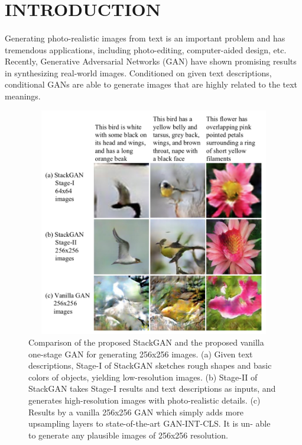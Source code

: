 \documentclass[a4paper,12pt,oneside]{article}
\begin{document}
\setlength{\baselineskip}{1.0\baselineskip}
\newpage
\begin{center}
\tableofcontents
\end{center}
\newpage
\thispagestyle{plain}
\begin{center}
\vspace{5mm}
\listoffigures
\end{center}

\newpage
\rfoot{\thepage}



\rfoot{\thepage}
\section{INTRODUCTION}
\paragraph{}
Generating photo-realistic images from text is an important problem and has tremendous applications, including photo-editing, computer-aided design, etc. Recently, Generative Adversarial Networks (GAN) have shown promising results in synthesizing real-world images. Conditioned on given text descriptions, conditional GANs are able to generate images that are highly related to the text meanings. 

\begin{figure}[H]
\centering
\includegraphics[height=10cm,width=15cm]{Figure1.png}
\caption[Comparison of the proposed StackGAN and the proposed vanilla one-stage GAN for generating 256x256 images]{Comparison of the proposed StackGAN and the proposed vanilla one-stage GAN for generating 256x256 images. (a) Given text descriptions, Stage-I of StackGAN sketches rough shapes and basic colors of objects, yielding low-resolution images. (b) Stage-II of StackGAN takes Stage-I results and text descriptions as inputs, and generates high-resolution images with photo-realistic details. (c) Results by a vanilla 256x256 GAN which simply adds more upsampling layers to state-of-the-art GAN-INT-CLS. It is un- able to generate any plausible images of 256x256 resolution. }
\end{figure}
\end{document}
